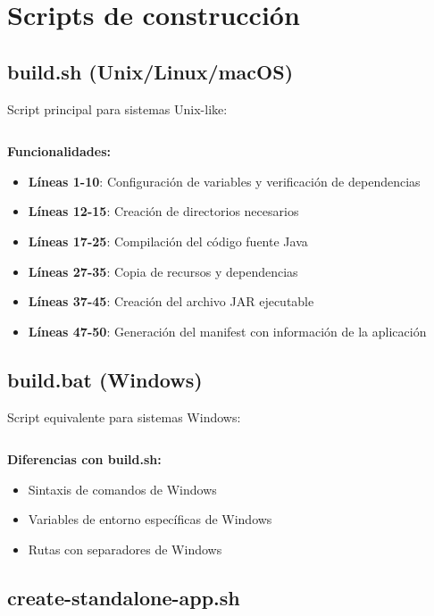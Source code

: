 \section{Scripts de construcción}

\subsection{build.sh (Unix/Linux/macOS)}

Script principal para sistemas Unix-like:

\inputminted[linenos,breaklines]{bash}{codigo/build.sh}

\textbf{Funcionalidades:}

\begin{itemize}
    \item \textbf{Líneas 1-10}: Configuración de variables y verificación de dependencias
    \item \textbf{Líneas 12-15}: Creación de directorios necesarios
    \item \textbf{Líneas 17-25}: Compilación del código fuente Java
    \item \textbf{Líneas 27-35}: Copia de recursos y dependencias
    \item \textbf{Líneas 37-45}: Creación del archivo JAR ejecutable
    \item \textbf{Líneas 47-50}: Generación del manifest con información de la aplicación
\end{itemize}

\subsection{build.bat (Windows)}

Script equivalente para sistemas Windows:

\inputminted[linenos,breaklines]{batch}{codigo/build.bat}

\textbf{Diferencias con build.sh:}
\begin{itemize}
    \item Sintaxis de comandos de Windows
    \item Variables de entorno específicas de Windows
    \item Rutas con separadores de Windows
\end{itemize}

\subsection{create-standalone-app.sh}

